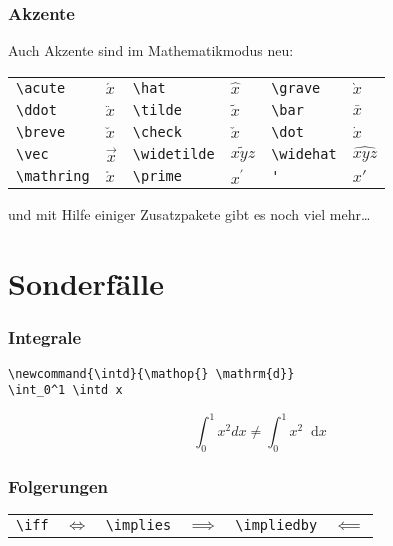 \begin{frame}[fragile]
  \frametitle{Akzente}

  \onslide<+->

  Auch Akzente sind im Mathematikmodus neu:

  \medskip

  \begin{center}
    \begin{tabular}{ll|ll|ll}
      \toprule
      \lstinline!\acute!    & $\acute x$    & \lstinline!\hat!       & $\hat x$          & \lstinline!\grave!   & $\grave x$ \\
      \lstinline!\ddot!     & $\ddot x$     & \lstinline!\tilde!     & $\tilde x$        & \lstinline!\bar!     & $\bar x$ \\
      \lstinline!\breve!    & $\breve x$    & \lstinline!\check!     & $\check x$        & \lstinline!\dot!     & $\dot x$ \\
      \lstinline!\vec!      & $\vec x$      & \lstinline!\widetilde! & $\widetilde{xyz}$ & \lstinline!\widehat! & $\widehat{xyz}$ \\
      \lstinline!\mathring! & $\mathring x$ & \lstinline!\prime!     & $x^{\prime}$        & \lstinline!'!        & $x'$\\
      \bottomrule
    \end{tabular}
  \end{center}

  \medskip

  und mit Hilfe einiger Zusatzpakete gibt es noch viel mehr\ldots
\end{frame}

\section{Sonderfälle}
\begin{frame}[fragile]
  \frametitle{Integrale}
\begin{lstlisting}
\newcommand{\intd}{\mathop{} \mathrm{d}}
\int_0^1 \intd x
\end{lstlisting}
    \begin{equation*}
      \int_0^1x^2dx \neq \int_0^1 \! x^2 \mathop{} \mathrm{d}x
    \end{equation*}
\end{frame}

\begin{frame}[fragile]
  \frametitle{Folgerungen}
  \begin{center}
    \begin{tabular}{ll|ll|ll}
      \lstinline!\iff! & $\iff$ & \lstinline!\implies! & $\implies$ & \lstinline!\impliedby! & $\impliedby$
    \end{tabular}
  \end{center}
\end{frame}


